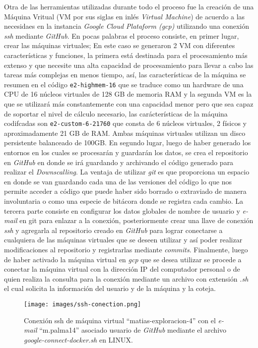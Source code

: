 Otra de las herramientas utilizadas durante todo el proceso fue la creación de una Máquina Vritual (VM por sus siglas en inlés \textit{Virtual Machine}) de acuerdo a las necesidaes en la instancia
\textit{Google Cloud Plataform (gcp)}  utilizando una conexión \textit{ssh} mediante \textit{GitHub}. En pocas palabras el proceso consiste, en primer lugar, crear las máquinas virtuales;
En este caso se generaron 2 VM con diferentes características y funciones, la primera está destinada para el procesamiento más extenso y que necesite una alta capacidad de procesamiento para llevar a cabo las tareas más complejas en menos tiempo,
así, las características de la máquina se resumen en el código \texttt{e2-highmem-16} que se traduce como un hardware de una CPU de 16 núcleos virtuales de 128 GB de memoria RAM y la segunda VM es la que se utilizará
más constantemente con una capacidad menor pero que sea capaz de soportar el nivel de cálculo necesario, las carácterísticas de la máquina codifcadas son \texttt{e2-custom-6-21760} que consta de 6 núcleos virtuales,
2 físicos y aproximadamente 21 GB de RAM. Ambas máquinas virtuales utilizan un disco persistente balanceado de 100GB. En segundo lugar, luego de haber generado los entornos en los cuales se procesarán y guardarán los datos, se crea el repositorio en \textit{GitHub} en 
donde se irá guardando y archivando el código generado para realizar el \textit{Downscalling}. La ventaja de utilizar \textit{git} es que proporciona un espacio en donde se van guardando cada una de las versiones del código 
lo que nos permite acceder a código que puede haber sido borrado o extraviado de manera involuntaria o como una especie de bitácora donde se registra cada cambio.
La tercera parte consiste en configurar los datos globales de nombre de usuario y \textit{e-mail} en git para
enlazar a la conexión, posteriormente crear una llave de conexión \textit{ssh} y agregarla al repositorio creado en \textit{GitHub} para lograr conectarse a cualquiera de las máquinas virtuales que se deseen utilizar y así poder realizar modificaciones 
al repositorio y registrarlas mediante \textit{commits}.
Finalmente, luego de haber activado la máquina virtual en \textit{gcp} que se desea utilizar se procede a conectar la máquina virtual con la dirección IP del computador personal o de quien realiza la consulta para la conexión
mediante un archivo con extensión \textit{.sh} el cual solicita la información del usuario y de la máquina y la coteja.


\begin{figure}[H]
    \centering
          \texttt{[image: images/ssh-conection.png]}
    \caption[Conexión ssh de máquina virtual]{\footnotesize Conexión ssh de máquina virtual ``matias-exploracion-4'' con el \textit{e-mail} ``m.palma14'' asociado usuario de \textit{GitHub} mediante el archivo \textit{google-connect-docker.sh} en LINUX.}
\end{figure}

